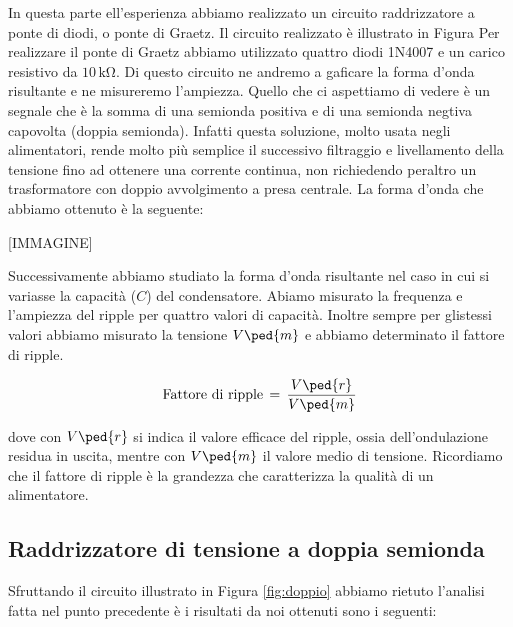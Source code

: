 In questa parte ell'esperienza abbiamo realizzato un circuito raddrizzatore a ponte di diodi, o ponte di Graetz. Il circuito realizzato è illustrato in Figura %
Per realizzare il ponte di Graetz abbiamo utilizzato quattro diodi 1N4007 e un carico resistivo da $10\,\si{\kilo\ohm}$. Di questo circuito ne andremo a gaficare la forma d'onda risultante e ne misureremo l'ampiezza.
Quello che ci aspettiamo di vedere è un segnale che è la somma di una semionda positiva e di una semionda negtiva capovolta (doppia semionda).
Infatti questa soluzione, molto usata negli alimentatori, rende molto più semplice il successivo filtraggio e livellamento della tensione fino ad ottenere una corrente continua, non richiedendo peraltro un trasformatore con doppio avvolgimento a presa centrale.
La forma d'onda che abbiamo ottenuto è la seguente:

[IMMAGINE]

Successivamente abbiamo studiato la forma d'onda risultante nel caso in cui si variasse la capacità ($C$) del condensatore. Abiamo misurato la frequenza e l'ampiezza del ripple per quattro valori di capacità. Inoltre sempre per glistessi valori abbiamo misurato la tensione $V\ped{m}$ e abbiamo determinato il fattore di ripple.

\begin{equation}
	\text{Fattore di ripple} \,=\, \frac{V\ped{r}}{V\ped{m}}
\end{equation}

dove con $V\ped{r}$ si indica il valore efficace del ripple, ossia dell’ondulazione residua in uscita, mentre con $V\ped{m}$ il valore medio di tensione.
Ricordiamo che il fattore di ripple è la grandezza che caratterizza la qualità di un alimentatore.

\subsection{Raddrizzatore di tensione a doppia semionda}

Sfruttando il circuito illustrato in Figura \ref{fig:doppio} abbiamo rietuto l'analisi fatta nel punto precedente è i risultati da noi ottenuti sono i seguenti:





